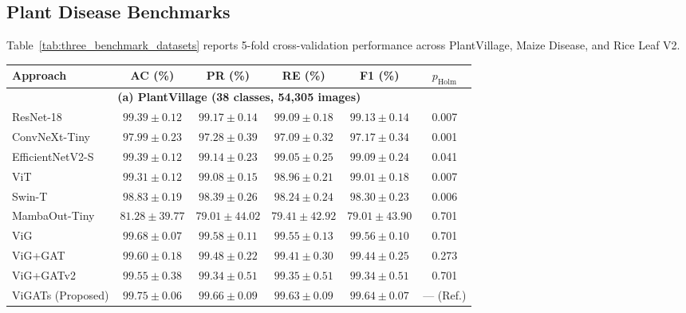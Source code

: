 \documentclass[]{interact}
\theoremstyle{plain}
\theoremstyle{definition}
\theoremstyle{remark}
\newcommand{\bestresult}[1]{\textcolor{bestgreen}{\textbf{#1}}}
\newcommand{\secondresult}[1]{\textcolor{secondorange}{#1}}
\begin{document}
{\subsection{Plant Disease Benchmarks}
\label{sec:plant_disease_benchmarks}

Table~\ref{tab:three_benchmark_datasets} reports 5-fold cross-validation performance across PlantVillage, Maize Disease, and Rice Leaf V2.

\begin{table}[H]
\footnotesize
\setlength{\tabcolsep}{3.0pt}
{\begin{tabular}{lccccc} \toprule
\textbf{Approach} & \textbf{AC (\%)} & \textbf{PR (\%)} & \textbf{RE (\%)} & \textbf{F1 (\%)} & \textbf{$p_{\mathrm{Holm}}$} \\ \midrule
\multicolumn{6}{c}{\textbf{(a) PlantVillage (38 classes, 54,305 images)}} \\ \midrule
ResNet-18 \citep{he2016deep} & $99.39 \pm 0.12$ & $99.17 \pm 0.14$ & $99.09 \pm 0.18$ & $99.13 \pm 0.14$ & 0.007 \\
ConvNeXt-Tiny \citep{liu2022convnext} & $97.99 \pm 0.23$ & $97.28 \pm 0.39$ & $97.09 \pm 0.32$ & $97.17 \pm 0.34$ & 0.001 \\
EfficientNetV2-S \citep{tan2021efficientnetv2} & $99.39 \pm 0.12$ & $99.14 \pm 0.23$ & $99.05 \pm 0.25$ & $99.09 \pm 0.24$ & 0.041 \\
ViT \citep{dosovitskiy2020image} & $99.31 \pm 0.12$ & $99.08 \pm 0.15$ & $98.96 \pm 0.21$ & $99.01 \pm 0.18$ & 0.007 \\
Swin-T \citep{liu2021swin} & $98.83 \pm 0.19$ & $98.39 \pm 0.26$ & $98.24 \pm 0.24$ & $98.30 \pm 0.23$ & 0.006 \\
MambaOut-Tiny \citep{yu2024mambaout} & $81.28 \pm 39.77$ & $79.01 \pm 44.02$ & $79.41 \pm 42.92$ & $79.01 \pm 43.90$ & 0.701 \\
ViG \citep{han2022vision} & \secondresult{$99.68 \pm 0.07$} & \secondresult{$99.58 \pm 0.11$} & \secondresult{$99.55 \pm 0.13$} & \secondresult{$99.56 \pm 0.10$} & 0.701 \\
ViG+GAT \citep{velickovic2018graph} & $99.60 \pm 0.18$ & $99.48 \pm 0.22$ & $99.41 \pm 0.30$ & $99.44 \pm 0.25$ & 0.273 \\
ViG+GATv2 \citep{brody2022gat} & $99.55 \pm 0.38$ & $99.34 \pm 0.51$ & $99.35 \pm 0.51$ & $99.34 \pm 0.51$ & 0.701 \\
ViGATs (Proposed) & \bestresult{$99.75 \pm 0.06$} & \bestresult{$99.66 \pm 0.09$} & \bestresult{$99.63 \pm 0.09$} & \bestresult{$99.64 \pm 0.07$} & --- (Ref.) \\

\end{tabular}}
\end{table}}
\end{document}
